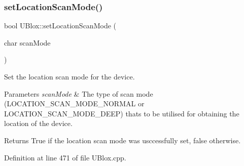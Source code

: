 \subsubsection{\texorpdfstring{set\+Location\+Scan\+Mode()}{setLocationScanMode()}}
{\footnotesize\ttfamily bool U\+Blox\+::set\+Location\+Scan\+Mode (\begin{DoxyParamCaption}\item[{char}]{scan\+Mode }\end{DoxyParamCaption})}

Set the location scan mode for the device.


\begin{DoxyParams}{Parameters}
{\em scan\+Mode} & The type of scan mode (L\+O\+C\+A\+T\+I\+O\+N\+\_\+\+S\+C\+A\+N\+\_\+\+M\+O\+D\+E\+\_\+\+N\+O\+R\+M\+AL or L\+O\+C\+A\+T\+I\+O\+N\+\_\+\+S\+C\+A\+N\+\_\+\+M\+O\+D\+E\+\_\+\+D\+E\+EP) that\textquotesingle{}s to be utilised for obtaining the location of the device. \\
\hline
\end{DoxyParams}
\begin{DoxyReturn}{Returns}
True if the location scan mode was usccessfully set, false otherwise. 
\end{DoxyReturn}


Definition at line 471 of file U\+Blox.\+cpp.


